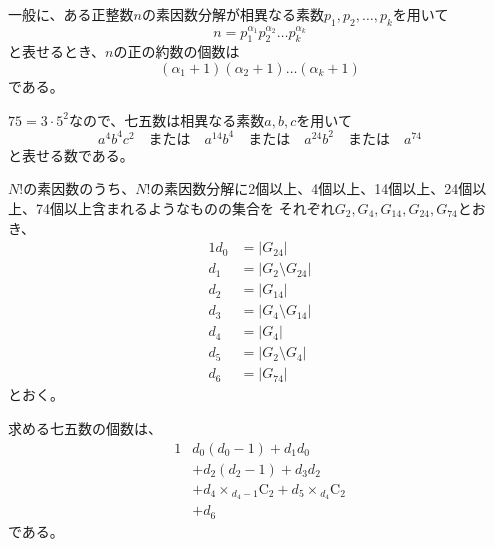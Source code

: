 \documentclass{article}
\newcommand{\combination}[2]{{}_{#1} \mathrm{C}_{#2}}
\begin{document}
一般に、ある正整数$n$の素因数分解が相異なる素数$p_1, p_2, \dots, p_k$を用いて
\begin{equation}
    n = p_1^{\alpha_1} p_2^{\alpha_2} \dots p_k^{\alpha_k}
\end{equation}
と表せるとき、$n$の正の約数の個数は
\begin{equation}
    (\alpha_1 + 1)(\alpha_2 + 1) \dots (\alpha_k + 1)
\end{equation}
である。

$75 = 3 \cdot 5^2$なので、七五数は相異なる素数$a, b, c$を用いて
\begin{equation}
    a^4 b^4 c^2 \quad \mbox{または} \quad a^{14} b^4 \quad \mbox{または} \quad a^{24} b^2
    \quad \mbox{または} \quad a^74
\end{equation}
と表せる数である。

$N!$の素因数のうち、$N!$の素因数分解に2個以上、4個以上、14個以上、24個以上、74個以上含まれるようなものの集合を
それぞれ$G_2, G_4, G_{14}, G_{24}, G_{74}$とおき、
\begin{alignat}{1}
    d_0 &= |G_{24}| \\
    d_1 &= |G_2 \setminus G_{24}| \\
    d_2 &= |G_{14}| \\
    d_3 &= |G_4 \setminus G_{14}| \\
    d_4 &= |G_4| \\
    d_5 &= |G_2 \setminus G_4| \\
    d_6 &= |G_{74}|
\end{alignat}
とおく。

求める七五数の個数は、
\begin{alignat}{1}
    &d_0 (d_0 - 1) + d_1 d_0 \\
    &+ d_2 (d_2 - 1) + d_3 d_2 \\
    &+ d_4 \times \combination{d_4 - 1}{2} + d_5 \times \combination{d_4}{2} \\
    &+ d_6
\end{alignat}
である。
\end{document}
